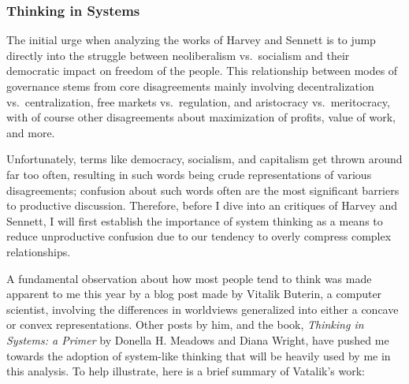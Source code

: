 \documentclass[12pt,a4paper]{article}
\begin{document}
\subsubsection{Thinking in Systems}
\vspace*{-8pt}
The initial urge when analyzing the works of Harvey and Sennett is to jump directly into the struggle between neoliberalism vs.\ socialism and their democratic impact on freedom of the people. This relationship between modes of governance stems from core disagreements mainly involving decentralization vs.\ centralization, free markets vs.\ regulation, and aristocracy vs.\ meritocracy, with of course other disagreements about maximization of profits, value of work, and more. 

Unfortunately, terms like democracy, socialism, and capitalism get thrown around far too often, resulting in such words being crude representations of various disagreements; confusion about such words often are the most significant barriers to productive discussion. Therefore, before I dive into an critiques of Harvey and Sennett, I will first establish the importance of system thinking as a means to reduce unproductive confusion due to our tendency to overly compress complex relationships. 

A fundamental observation about how most people tend to think was made apparent to me this year by a blog post made by Vitalik Buterin, a computer scientist, involving the differences in worldviews generalized into either a concave or convex representations. Other posts by him, and the book, \textit{Thinking in Systems: a Primer} by Donella H. Meadows and Diana Wright, have pushed me towards the adoption of system-like thinking that will be heavily used by me in this analysis. To help illustrate, here is a brief summary of Vatalik's work:
\end{document}
